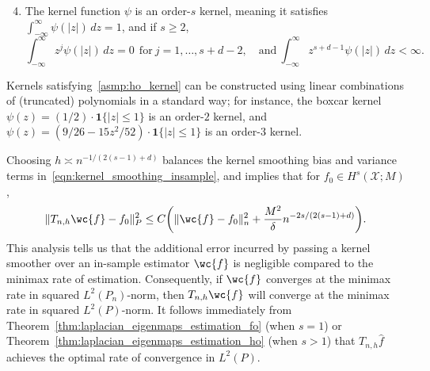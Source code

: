 \documentclass[aos]{imsart}
\theoremstyle{plain}
\theoremstyle{definition}
\theoremstyle{remark}
\newcommand{\wh}[1]{\widehat{#1}}
\newcommand{\mc}[1]{\mathcal{#1}}
\newcommand{\1}{\mathbf{1}}
\begin{document}
\begin{enumerate}[label=(K\arabic*)]
	\setcounter{enumi}{3}
	\item
	\label{asmp:ho_kernel}
	The kernel function $\psi$ is an order-$s$ kernel, meaning it satisfies $\int_{-\infty}^{\infty} \psi(|z|) \,dz = 1$, and if $s \geq 2$,
	\begin{equation*}
	\int_{-\infty}^{\infty} z^j \psi(|z|) \,dz = 0 ~~\textrm{for}~j = 1,\ldots, s + d - 2, \quad \textrm{and}~ \int_{-\infty}^{\infty} z^{s + d - 1} \psi(|z|) \,dz < \infty. 
	\end{equation*}
\end{enumerate}
Kernels satisfying~\ref{asmp:ho_kernel} can be constructed using linear combinations of (truncated) polynomials in a standard way; for instance, the boxcar kernel $\psi(z) = (1/2)\cdot\1\{|z| \leq 1\}$ is an order-$2$ kernel, and $\psi(z) = (9/26 - 15z^2/52)\cdot\1\{|z| \leq 1\}$ is an order-$3$ kernel.

Choosing $h \asymp n^{-1/(2(s - 1) + d)}$ balances the kernel smoothing bias and variance terms in~\eqref{eqn:kernel_smoothing_insample}, and implies that for $f_0 \in H^s(\mc{X};M)$,
\begin{equation}
\label{eqn:kernel_smoothing_insample2}
\|T_{n,h}\wc{f} - f_0\|_P^2 \leq C\biggl(\|\wc{f} - f_0\|_n^2 + \frac{M^2}{\delta}n^{-2s/(2(s - 1) + d)}\biggr).
\end{equation}
This analysis tells us that the additional error incurred by passing a kernel smoother over an in-sample estimator $\wc{f}$ is negligible compared to the minimax rate of estimation. Consequently, if $\wc{f}$ converges at the minimax rate in squared $L^2(P_n)$-norm, then $T_{n,h}\wc{f}$ will converge at the minimax rate in squared $L^2(P)$-norm. It follows immediately from Theorem~\ref{thm:laplacian_eigenmaps_estimation_fo} (when $s = 1$) or Theorem~\ref{thm:laplacian_eigenmaps_estimation_ho} (when $s > 1$) that $T_{n,h}\wh{f}$ achieves the optimal rate of convergence in $L^2(P)$.
\end{document}
